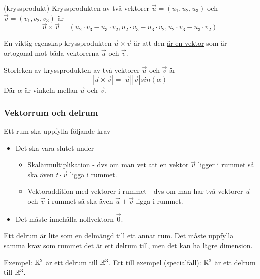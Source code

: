 \documentclass[../main.tex]{subfiles}
\begin{document}
\begin{formel}{(kryssprodukt)}
\label{kryssprod} 
Kryssprodukten av två vektorer $\vec{u} = (u_1, u_2, u_3)$ och $\vec{v} = (v_1, v_2, v_3)$ är
\[\vec{u}\times \vec{v} = (u_2\cdot v_3 - u_3\cdot v_2, u_2\cdot v_3 - u_3\cdot v_2, u_2\cdot v_3 - u_3\cdot v_2)\]

En viktig egenskap kryssprodukten $\vec{u}\times\vec{v}$ är att den \underline{är en vektor} som är ortogonal mot båda vektorerna $\vec{u}$ och $\vec{v}$.
\end{formel}


\begin{formel}
\label{kryssprodsize} 
Storleken av kryssprodukten av två vektorer $\vec{u}$ och $\vec{v}$ är
\[|\vec{u}\times \vec{v}| = |\vec{u}||\vec{v}|sin(\alpha)\]
Där $\alpha$ är vinkeln mellan $\vec{u}$ och $\vec{v}$.
\end{formel}

\subsubsection{Vektorrum och delrum}
\label{vektorrum}
Ett rum ska uppfylla följande krav
\begin{itemize}
    \item Det ska vara slutet under
    \begin{itemize}
        \item Skalärmultiplikation - dvs om man vet att en vektor $\vec{v}$ ligger i rummet så ska även $t\cdot\vec{v}$ ligga i rummet.
        \item Vektoraddition med vektorer i rummet - dvs om man har två vektorer $\vec{u}$ och $\vec{v}$ i rummet så ska även $\vec{u}+\vec{v}$ ligga i rummet.
    \end{itemize}
    \item Det måste innehålla nollvektorn $\vec{0}$.
\end{itemize}

Ett delrum är lite som en delmängd till ett annat rum. Det måste uppfylla samma krav som rummet det är ett delrum till, men det kan ha lägre dimension. 

Exempel: $\mathbb{R}^{2}$ är ett delrum till $\mathbb{R}^{3}$. Ett till exempel (specialfall): $\mathbb{R}^{3}$ är ett delrum till $\mathbb{R}^{3}$.
\end{document}
